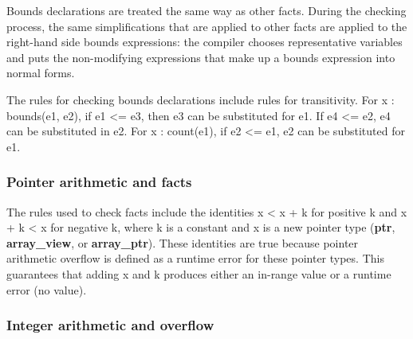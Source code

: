 \documentclass[]{article}
\begin{document}
Bounds declarations are treated the same way as other facts. During the
checking process, the same simplifications that are applied to other
facts are applied to the right-hand side bounds expressions: the
compiler chooses representative variables and puts the non-modifying
expressions that make up a bounds expression into normal forms.

The rules for checking bounds declarations include rules for
transitivity. For x : bounds(e1, e2), if e1 \textless{}= e3, then e3 can
be substituted for e1. If e4 \textless{}= e2, e4 can be substituted in
e2. For x : count(e1), if e2 \textless{}= e1, e2 can be substituted for
e1.

\subsubsection{\texorpdfstring{\protect\hypertarget{ux5fToc420589191}{}{\protect\hypertarget{ux5fToc422906982}{}{\protect\hypertarget{ux5fToc424307722}{}{\protect\hypertarget{ux5fToc426641120}{}{\protect\hypertarget{ux5fToc435434995}{}{\protect\hypertarget{ux5fToc437460828}{}{\protect\hypertarget{ux5fToc440445509}{}{\protect\hypertarget{ux5fToc440449291}{}{\protect\hypertarget{ux5fToc440551941}{}{}}}}}}}}}Pointer
arithmetic and
facts}{Pointer arithmetic and facts}}\label{pointer-arithmetic-and-facts}

The rules used to check facts include the identities x \textless{} x + k
for positive k and x + k \textless{} x for negative k, where k is a
constant and x is a new pointer type (\textbf{ptr},
\textbf{array\_view}, or \textbf{array\_ptr}). These identities are true
because pointer arithmetic overflow is defined as a runtime error for
these pointer types. This guarantees that adding x and k produces either
an in-range value or a runtime error (no value).

\subsubsection{\texorpdfstring{\protect\hypertarget{ux5fToc415731235}{}{\protect\hypertarget{ux5fToc420589192}{}{\protect\hypertarget{ux5fToc422906983}{}{\protect\hypertarget{ux5fToc424307723}{}{\protect\hypertarget{ux5fToc426641121}{}{\protect\hypertarget{ux5fToc435434996}{}{\protect\hypertarget{ux5fToc437460829}{}{\protect\hypertarget{ux5fToc440445510}{}{\protect\hypertarget{ux5fToc440449292}{}{\protect\hypertarget{ux5fToc440551942}{}{}}}}}}}}}}Integer
arithmetic and
overflow}{Integer arithmetic and overflow}}\label{integer-arithmetic-and-overflow}
\end{document}
